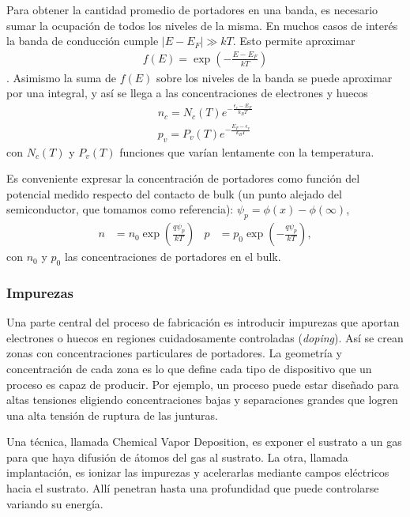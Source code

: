 Para obtener la cantidad promedio de portadores en una banda,
es necesario sumar la ocupación de todos los niveles de la misma. 
En muchos casos de interés la banda de conducción cumple 
$|E-E_F| \gg kT$.
Esto permite aproximar
\begin{align*}
    f(E) = \exp\left(-\frac{E-E_F}{kT}\right)
\end{align*}.
Asimismo la suma de $f(E)$ sobre los niveles de la banda se puede aproximar
por una integral, y así se llega a las concentraciones de electrones y huecos
\begin{align*}
    n_c = N_c(T)e^{-\frac{\epsilon_c-E_F}{k_BT}}\\
    p_v = P_v(T)e^{-\frac{E_F-\epsilon_v}{k_BT}}
\end{align*} con $N_c(T)$ y $P_v(T)$ funciones que varían lentamente con la
temperatura.

Es conveniente expresar la concentración de portadores 
como función del potencial medido respecto del contacto de bulk
(un punto alejado del semiconductor, que tomamos como referencia):
$\psi_p=\phi(x)-\phi(\infty)$,
\begin{align}
    n &= n_0\exp\left(\frac{q\psi_p}{kT}\right)&
    p &= p_0\exp\left(-\frac{q\psi_p}{kT}\right),
    \label{eq:portadores_nodegenerados}
\end{align}
con $n_0$ y $p_0$ las concentraciones de portadores en el bulk.
\subsubsection{Impurezas}
Una parte central del proceso de fabricación
es introducir impurezas que aportan electrones o huecos
en regiones cuidadosamente controladas (\emph{doping}).
Así se crean zonas con concentraciones particulares de portadores.
La geometría y concentración de cada zona
es lo que define cada tipo de dispositivo 
que un proceso es capaz de producir.
Por ejemplo, un proceso puede estar diseñado para altas tensiones
eligiendo concentraciones bajas y separaciones grandes
que logren una alta tensión de ruptura de las junturas.

Una técnica, llamada Chemical Vapor Deposition,
es exponer el sustrato a un gas
para que haya difusión de átomos del gas al sustrato.
La otra, llamada implantación, es ionizar las impurezas 
y acelerarlas mediante campos eléctricos hacia el sustrato.
Allí penetran hasta una profundidad que puede controlarse 
variando su energía\cite{campbell_science_2001}.


